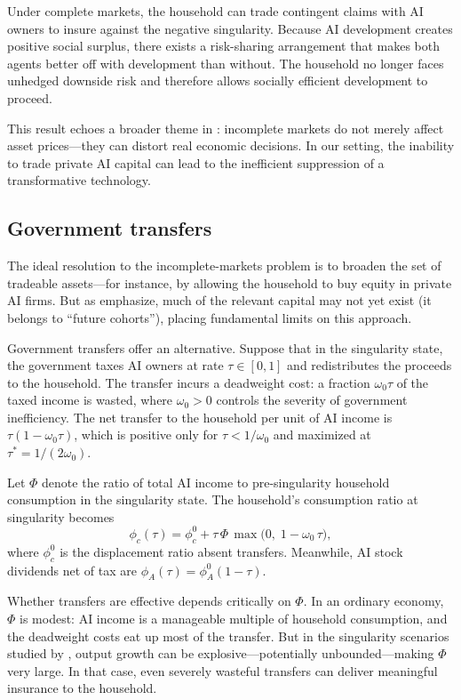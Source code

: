 \documentclass[12pt]{article}
\begin{document}
Under complete markets, the household can trade contingent claims with AI owners to insure against the negative singularity.
Because AI development creates positive social surplus, there exists a risk-sharing arrangement that makes both agents better off with development than without.
The household no longer faces unhedged downside risk and therefore allows socially efficient development to proceed.

This result echoes a broader theme in \citet{GKP2012}: incomplete markets do not merely affect asset prices---they can distort real economic decisions.
In our setting, the inability to trade private AI capital can lead to the inefficient suppression of a transformative technology.

\subsection{Government transfers}

The ideal resolution to the incomplete-markets problem is to broaden the set of tradeable assets---for instance, by allowing the household to buy equity in private AI firms.
But as \citet{GKP2012} emphasize, much of the relevant capital may not yet exist (it belongs to ``future cohorts''), placing fundamental limits on this approach.

Government transfers offer an alternative.
Suppose that in the singularity state, the government taxes AI owners at rate $\tau \in [0,1]$ and redistributes the proceeds to the household.
The transfer incurs a deadweight cost: a fraction $\omega_0 \tau$ of the taxed income is wasted, where $\omega_0 > 0$ controls the severity of government inefficiency.
The net transfer to the household per unit of AI income is $\tau(1 - \omega_0 \tau)$, which is positive only for $\tau < 1/\omega_0$ and maximized at $\tau^* = 1/(2\omega_0)$.

Let $\Phi$ denote the ratio of total AI income to pre-singularity household consumption in the singularity state.
The household's consumption ratio at singularity becomes
\begin{equation}
\phi_c(\tau) = \phi_c^0 + \tau\,\Phi\,\max\!\big(0,\; 1 - \omega_0\,\tau\big),
\label{eq:phi_c_tau} %
\end{equation}
where $\phi_c^0$ is the displacement ratio absent transfers.
Meanwhile, AI stock dividends net of tax are $\phi_A(\tau) = \phi_A^0(1 - \tau)$.

Whether transfers are effective depends critically on $\Phi$.
In an ordinary economy, $\Phi$ is modest: AI income is a manageable multiple of household consumption, and the deadweight costs eat up most of the transfer.
But in the singularity scenarios studied by \citet{Jones2024}, output growth can be explosive---potentially unbounded---making $\Phi$ very large.
In that case, even severely wasteful transfers can deliver meaningful insurance to the household.
\end{document}
